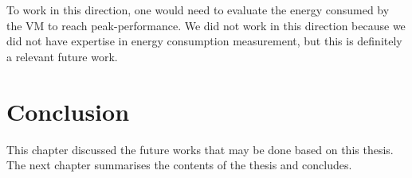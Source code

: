 \documentclass[a4paper,12pt,twoside]{../includes/ThesisStyle}
\begin{document}
To work in this direction, one would need to evaluate the energy consumed by the VM to reach peak-performance. We did not work in this direction because we did not have expertise in energy consumption measurement, but this is definitely a relevant future work.

\section*{Conclusion}

This chapter discussed the future works that may be done based on this thesis. The next chapter summarises the contents of the thesis and concludes.

\ifx\wholebook\relax\else
    
\end{document}

